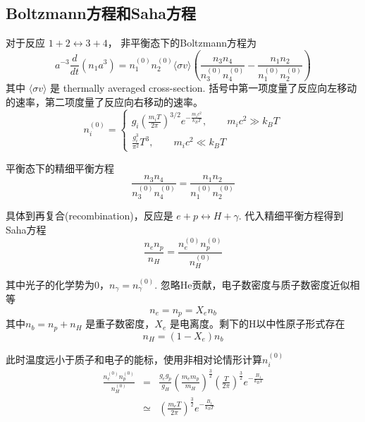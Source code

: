 \documentclass[]{ctexart}
\begin{document}
\subsection*{Boltzmann方程和Saha方程}
对于反应 $1+2 \longleftrightarrow 3+4$，
非平衡态下的Boltzmann方程为
\begin{equation}
    a^{-3} \frac{d}{d t}\left(n_{1} a^{3}\right)=n_{1}^{(0)} n_{2}^{(0)}\langle\sigma v\rangle\left(\frac{n_{3} n_{4}}{n_{3}^{(0)} n_{4}^{(0)}}-\frac{n_{1} n_{2}}{n_{1}^{(0)} n_{2}^{(0)}}\right)
\end{equation}
其中 $\langle\sigma v\rangle$ 是 thermally averaged cross-section. 括号中第一项度量了反应向左移动的速率，第二项度量了反应向右移动的速率。
\begin{equation}
    n_{i}^{(0)}=\left\{\begin{array}{l}
    g_{i}\left(\frac{m_i T}{2 \pi}\right)^{3 / 2} e^{-\frac{m_{i} c^{2}}{k_{B} T}  }, \qquad m_{i} c^{2}\gg k_{B} T \\
    \frac{g_{i}^{3}}{\pi^{2}}T^3, \qquad m_{i} c^{2}\ll k_{B} T 
    \end{array}\right.
\end{equation}

平衡态下的精细平衡方程
\begin{equation}
    \frac{n_{3} n_{4}}{n_{3}^{(0)} n_{4}^{(0)}}=\frac{n_{1} n_{2}}{n_{1}^{(0)} n_{2}^{(0)}}
\end{equation}

具体到再复合(recombination)，反应是 $e+p \leftrightarrow H+\gamma$.
代入精细平衡方程得到Saha方程
\begin{equation}
    \frac{n_{e}n_p}{n_{H}}=\frac{n_{e}^{(0)} n_{p}^{(0)}}{n_{H}^{(0)}}
\end{equation}

其中光子的化学势为0，$n_\gamma = n_{\gamma}^{(0)}$.
忽略He贡献，电子数密度与质子数密度近似相等
$$n_{e}=n_{p}=X_{e} n_{b}$$
其中$n_{b}=n_{p}+n_{H}$ 是重子数密度，$X_e$ 是电离度。剩下的H以中性原子形式存在
$$n_{H}=\left(1 - X_{e}\right) n_{b}$$

此时温度远小于质子和电子的能标，使用非相对论情形计算$n_i^{(0)}$
\begin{eqnarray}
      \frac{n_{e}^{(0)} n_{p}^{(0)}}{n_{H}^{(0)}} &=& \frac{g_e g_p}{g_H} \left(\frac{m_e m_p}{m_H}\right)^\frac{3}{2} \left(\frac{T}{2\pi }\right)^\frac{3 }{2} e^{-\frac{B_1}{k_B T}} \\ 
      &\simeq&\left(\frac{m_e T}{2\pi }\right)^\frac{3 }{2} e^{-\frac{B_1}{k_B T}}
\end{eqnarray}
\end{document}
